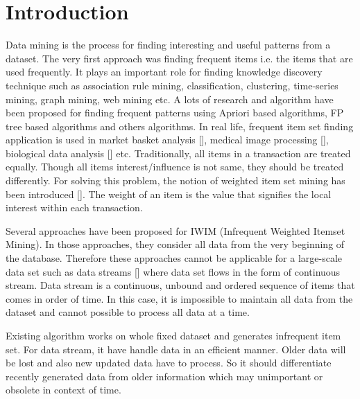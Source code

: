 \chapter{Introduction}
Data mining is the process for finding interesting and useful patterns from a dataset. The very first approach was finding frequent items i.e. the items that are used frequently. It plays an important role for finding knowledge discovery technique such as association rule mining, classification, clustering, time-series mining, graph mining, web mining etc. A lots of research and algorithm have been proposed for finding frequent patterns using Apriori based algorithms, FP tree based algorithms and others algorithms. In real life, frequent item set finding application is used in market basket analysis [], medical image processing [], biological data analysis [] etc. Traditionally, all items in a transaction are treated equally. Though all items interest/influence is not same, they should be treated differently. For solving this problem, the notion of weighted item set mining has been introduced []. The weight of an item is the value that signifies the local interest within each transaction. 
\par
Several approaches have been proposed for IWIM (Infrequent Weighted Itemset Mining). In those approaches, they consider all data from the very beginning of the database. Therefore these approaches cannot be applicable for a large-scale data set such as data streams [] where data set flows in the form of continuous stream. Data stream is a continuous, unbound and ordered sequence of items that comes in order of time. In this case, it is impossible to maintain all data from the dataset and cannot possible to process all data at a time.  
\par
Existing algorithm works on whole fixed dataset and generates infrequent item set. For data stream, it have handle data in an efficient manner. Older data will be lost and also new updated data have to process. So it should differentiate recently generated data from older information which may unimportant or obsolete in context of time.
\par
